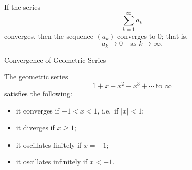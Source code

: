 \documentclass[12pt, a4paper]{article}
\begin{document}
\clearpage

\begin{theorem}
	If the series 
	\[
	\sum_{k=1}^{\infty} a_k
	\]
	converges, then the sequence $(a_k)$ converges to $0$; that is,
	\[
	a_k \longrightarrow 0 \quad \text{as } k \to \infty.
	\]
\end{theorem}

\clearpage

\begin{heading}
	Convergence of Geometric Series
\end{heading}

\vspace{10pt}

\begin{theorem}
	The geometric series 
	\[
	1 + x + x^{2} + x^{3} + \cdots \ \text{to } \infty
	\]
	satisfies the following:

	\begin{itemize}
		\item it converges if $-1 < x < 1$, i.e.\ if $|x| < 1$;
		\item it diverges if $x \ge 1$;
		\item it oscillates finitely if $x = -1$;
		\item it oscillates infinitely if $x < -1$.
	\end{itemize}
\end{theorem}







\EndPage
\end{document}
